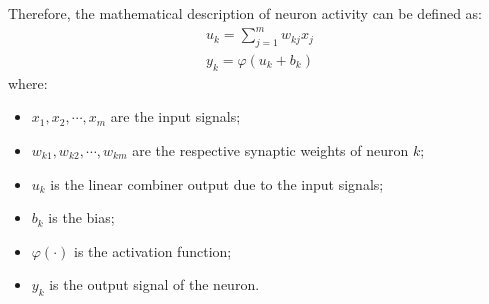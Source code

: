 Therefore, the mathematical description of neuron activity can be defined as:
\begin{eqnarray}
{ u }_{ k }=\sum _{ j=1 }^{ m }{ { w }_{ kj } } { x }_{ j }\\ 
{ y }_{ k }=\varphi \left( { u }_{ k }+b_{ k } \right)
\end{eqnarray}
where:
\begin{itemize}
	\item ${ x }_{ 1 },{ x }_{ 2 },\cdots ,{ x }_{ m }$ are the input signals;
	\item ${ w }_{ k1 },{ w }_{ k2 },\cdots ,{ w }_{ km }$ are the respective synaptic weights of neuron $k$;
	\item $u_k$ is the linear combiner output due to the input signals;
	\item $b_k$ is the bias;
	\item $\varphi(\cdot)$ is the activation function;
	\item $y_k$ is the output signal of the neuron.
\end{itemize}

